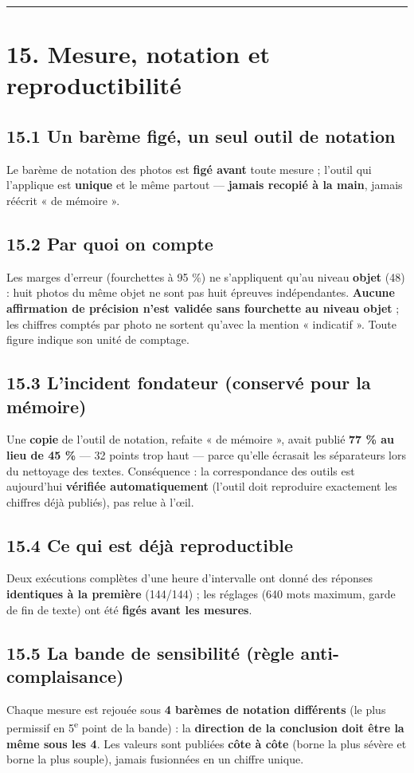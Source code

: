 \documentclass[11pt,a4paper]{article}
\begin{document}
\medskip\hrule\medskip
\section*{15. Mesure, notation et reproductibilité}
\subsection*{15.1 Un barème figé, un seul outil de notation}
Le barème de notation des photos est \textbf{figé avant} toute mesure ; l'outil qui l'applique est \textbf{unique} et le même partout — \textbf{jamais recopié à la main}, jamais réécrit « de mémoire ».

\subsection*{15.2 Par quoi on compte}
Les marges d'erreur (fourchettes à 95 \%) ne s'appliquent qu'au niveau \textbf{objet} (48) : huit photos du même objet ne sont pas huit épreuves indépendantes. \textbf{Aucune affirmation de précision n'est validée sans fourchette au niveau objet} ; les chiffres comptés par photo ne sortent qu'avec la mention « indicatif ». Toute figure indique son unité de comptage.

\subsection*{15.3 L'incident fondateur (conservé pour la mémoire)}
Une \textbf{copie} de l'outil de notation, refaite « de mémoire », avait publié \textbf{77 \% au lieu de 45 \%} — 32 points trop haut — parce qu'elle écrasait les séparateurs lors du nettoyage des textes. Conséquence : la correspondance des outils est aujourd'hui \textbf{vérifiée automatiquement} (l'outil doit reproduire exactement les chiffres déjà publiés), pas relue à l'œil.

\subsection*{15.4 Ce qui est déjà reproductible}
Deux exécutions complètes d'une heure d'intervalle ont donné des réponses \textbf{identiques à la première} (144/144) ; les réglages (640 mots maximum, garde de fin de texte) ont été \textbf{figés avant les mesures}.

\subsection*{15.5 La bande de sensibilité (règle anti-complaisance)}
Chaque mesure est rejouée sous \textbf{4 barèmes de notation différents} (le plus permissif en 5\textsuperscript{e} point de la bande) : la \textbf{direction de la conclusion doit être la même sous les 4}. Les valeurs sont publiées \textbf{côte à côte} (borne la plus sévère et borne la plus souple), jamais fusionnées en un chiffre unique.
\end{document}
